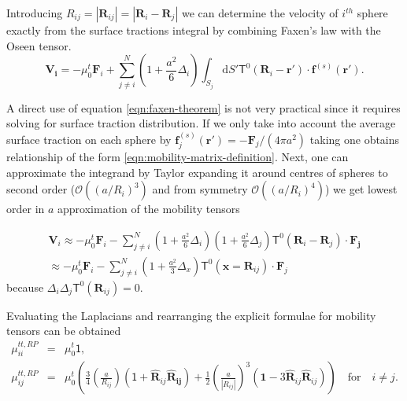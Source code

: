\documentclass{doctoral}
\newcommand{\dd}{\mathrm{d}}
\newcommand{\mm}[1]{\bm{\mathsf{#1}}} %
\begin{document}
Introducing $R_{ij} = |\bm{R}_{ij}| = |\bm{R}_i - \bm{R}_j|$ we can determine the velocity of $i^{th}$ sphere exactly from the surface tractions integral by combining Faxen's law \cite{Faxen_1922} with the Oseen tensor.
\begin{equation}
    \bm{V_i} =
    -\mu_0^t \bm{F}_i
    + \sum_{j\neq i}^N
    (1 + \frac{a^2}{6} \Delta_i)
    \int_{S_j} \dd S' \mm{T}^0(\bm{R}_i-\bm{r'})\cdot \bm{f}^{(s)}(\bm{r'}).
    \label{eqn:faxen-theorem}
\end{equation}

A direct use of equation \eqref{eqn:faxen-theorem} is not very practical since it requires solving for surface traction distribution.
If we only take into account the average surface traction on each sphere  by $\bm{f}_j^{(s)}(\bm{r'}) = -\bm{F}_j / (4\pi a^2)$ taking one obtains relationship of the form \eqref{eqn:mobility-matrix-definition}.
Next, one can approximate the integrand by Taylor expanding it around centres of spheres to second order ($\mathcal{O}((a/R_i)^3)$ and from symmetry $\mathcal{O}((a/R_i)^4)$) we get lowest order in $a$ approximation of the mobility tensors 

\begin{eqnarray}
    \bm{V}_i \approx -\mu_0^t \bm{F}_i  - \sum_{j\neq i}^N (1 + \frac{a^2}{6} \Delta_i) (1 + \frac{a^2}{6} \Delta_j) \mm{T}^{0} (\bm{R}_i - \bm{R}_j) \cdot \bm{F_j} \\
    \approx -\mu_0^t \bm{F}_i  - \sum_{j\neq i}^N (1 + \frac{a^2}{3} \Delta_x) \mm{T}^{0} (\bm{x} = \bm{R}_{ij}) \cdot \bm{F}_j \label{eqn:rotne-prager-derivation}
\end{eqnarray}
because $\Delta_i \Delta_j \mm{T}^0(\bm{R}_{ij}) = 0$.

Evaluating the Laplacians and rearranging the explicit formulae for mobility tensors can be obtained
\begin{eqnarray}
    \mm{\mu}_{ii}^{tt,RP} & = & \mu_0^t \mm{1},                                                                                                                                                                                                                                                                  \\
    \mm{\mu}_{ij}^{tt,RP} & = & \mu_0^t \left( \frac{3}{4} \left( \frac{a}{R_{ij}} \right) \left( \mm{1} + \bm{\hat{R}}_{ij} \bm{\hat{R}_{ij}} \right) + \frac{1}{2} \left( \frac{a}{|R_{ij}|} \right)^3 \left( \bm{1} -3  \bm{\hat{R}}_{ij}\bm{\hat{R}}_{ij} \right) \right) \quad \mathrm{for} \quad i \neq j.
    \label{eqn:rotne-prager-translation}
\end{eqnarray}
\end{document}
